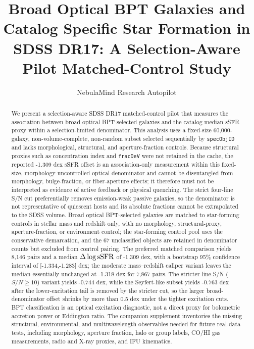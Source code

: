 \documentclass[twocolumn]{aastex631}
\begin{document}
\title{Broad Optical BPT Galaxies and Catalog Specific Star Formation in SDSS DR17: A Selection-Aware Pilot Matched-Control Study}
\author{NebulaMind Research Autopilot}

\begin{abstract}
We present a selection-aware SDSS DR17 matched-control pilot that measures the association between broad optical BPT-selected galaxies and the catalog median sSFR proxy within a selection-limited denominator. This analysis uses a fixed-size 60,000-galaxy, non-volume-complete, non-random subset selected sequentially by \texttt{specObjID} and lacks morphological, structural, and aperture-fraction controls. Because structural proxies such as concentration index and \texttt{fracDeV} were not retained in the cache, the reported -1.309 dex sSFR offset is an association-only measurement within this fixed-size, morphology-uncontrolled optical denominator and cannot be disentangled from morphology, bulge-fraction, or fiber-aperture effects; it therefore must not be interpreted as evidence of active feedback or physical quenching. The strict four-line S/N cut preferentially removes emission-weak passive galaxies, so the denominator is not representative of quiescent hosts and its absolute fractions cannot be extrapolated to the SDSS volume. Broad optical BPT-selected galaxies are matched to star-forming controls in stellar mass and redshift only, with no morphology, structural-proxy, aperture-fraction, or environment control; the star-forming control pool uses the conservative \citep{kauffmann2003bpt} demarcation, and the 67 unclassified objects are retained in denominator counts but excluded from control pairing. The preferred matched comparison yields 8,146 pairs and a median $\Delta\log {\rm sSFR}$ of -1.309 dex, with a bootstrap 95\% confidence interval of [-1.334,-1.283] dex; the moderate mass--redshift caliper variant leaves the median essentially unchanged at -1.318 dex for 7,867 pairs. The stricter line-S/N ($S/N \geq 10$) variant yields -0.744 dex, while the Seyfert-like subset yields -0.763 dex after the lower-excitation tail is removed by the stricter cut, so the larger broad-denominator offset shrinks by more than 0.5 dex under the tighter excitation cuts. BPT classification is an optical excitation diagnostic, not a direct proxy for bolometric accretion power or Eddington ratio. The companion supplement inventories the missing structural, environmental, and multiwavelength observables needed for future real-data tests, including morphology, aperture fraction, halo or group labels, CO/HI gas measurements, radio and X-ray proxies, and IFU kinematics.
\end{abstract}
\end{document}
